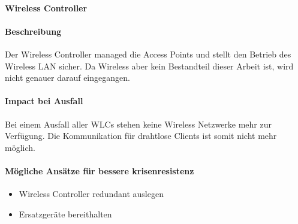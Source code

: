 \paragraph{Wireless Controller}
\paragraph{Beschreibung}
Der Wireless Controller managed die Access Points und stellt den Betrieb des Wireless LAN sicher. Da Wireless aber kein Bestandteil dieser Arbeit ist, wird nicht genauer darauf eingegangen.

\paragraph{Impact bei Ausfall}
Bei einem Ausfall aller WLCs stehen keine Wireless Netzwerke mehr zur Verfügung. Die Kommunikation für drahtlose Clients ist somit nicht mehr möglich.

\paragraph{Mögliche Ansätze für bessere krisenresistenz}
\begin{itemize}
	\item Wireless Controller redundant auslegen
	\item Ersatzgeräte bereithalten
\end{itemize}
